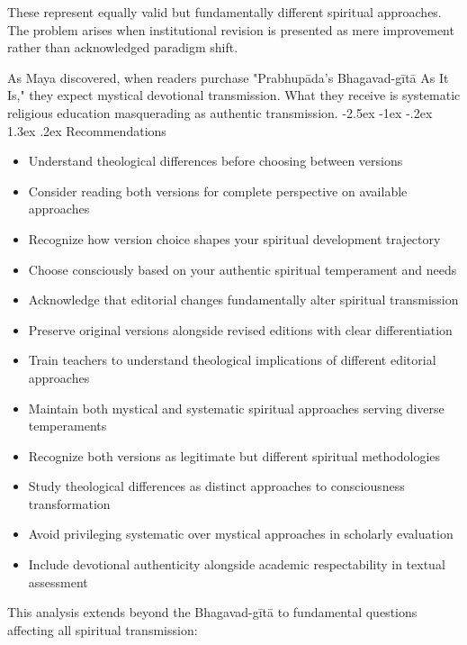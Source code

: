 \documentclass[12pt,twoside]{book}
\makeatletter
\renewcommand\section{\@startsection{section}{1}{\z@}%
{-2.5ex \@plus -1ex \@minus -.2ex}%
{1.3ex \@plus.2ex}%
{\normalfont\Large\bfseries}}
\makeatother
\begin{document}
These represent equally valid but fundamentally different spiritual approaches. The problem arises when institutional revision is presented as mere improvement rather than acknowledged paradigm shift.

As Maya discovered, when readers purchase "Prabhupāda's Bhagavad-gītā As It Is," they expect mystical devotional transmission. What they receive is systematic religious education masquerading as authentic transmission.
\section{Recommendations}
\label{sec:org998414c}

\begin{itemize}
\item Understand theological differences before choosing between versions
\item Consider reading both versions for complete perspective on available approaches
\item Recognize how version choice shapes your spiritual development trajectory
\item Choose consciously based on your authentic spiritual temperament and needs

\item Acknowledge that editorial changes fundamentally alter spiritual transmission
\item Preserve original versions alongside revised editions with clear differentiation
\item Train teachers to understand theological implications of different editorial approaches
\item Maintain both mystical and systematic spiritual approaches serving diverse temperaments

\item Recognize both versions as legitimate but different spiritual methodologies
\item Study theological differences as distinct approaches to consciousness transformation
\item Avoid privileging systematic over mystical approaches in scholarly evaluation
\item Include devotional authenticity alongside academic respectability in textual assessment
\end{itemize}

This analysis extends beyond the Bhagavad-gītā to fundamental questions affecting all spiritual transmission:
\end{document}
